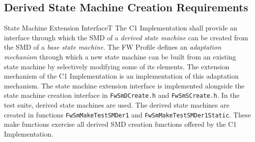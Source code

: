 \documentclass[a4paper,10pt]{article}
\newenvironment{fw_req}[6]
{\addtocounter{subsubsection}{1}
	\hspace{0.2cm}\textbf{FW-\arabic{section}.\arabic{subsection}.\arabic{subsubsection}/#2
	\hspace{0.8cm} #1}
	\vspace{-10pt}
\begin{longtable}{p{2.7cm}P{8.5cm}}
\hline
\textsc{Requirement} & #3 \\
\textsc{Justification} & #4 \\
\textsc{Implementation} & #5  \\ 
\textsc{Verification} & #6  \\
\hline
}
{\end{longtable}}
\begin{document}
\newpage
\subsection{Derived State Machine Creation Requirements}\label{req:creationInterfaceDerivedSM}

\begin{fw_req}{State Machine Extension Interface}{T}
{The C1 Implementation shall provide an interface through which 
the SMD of a \emph{derived state machine} can be created from the SMD of a 
\emph{base state machine}.}
{The FW Profile defines an \emph{adaptation mechanism} through 
which a new state machine can be built from an existing state machine by selectively 
modifying some of its elements. 
The extension mechanism of the C1 Implementation is an implementation of this adaptation 
mechanism.}
{The state machine extension interface is implemented alongside 
the state machine creation interface in \texttt{FwSmDCreate.h} and \texttt{FwSmSCreate.h}.} 
{In the test suite, derived state machines are used. 
The derived state machines are created in functions \texttt{FwSmMakeTestSMDer1} and 
\texttt{FwSmMakeTestSMDer1Static}. 
These make functions exercise all derived SMD creation functions offered 
by the C1 Implementation.}
\end{fw_req}
\end{document}
